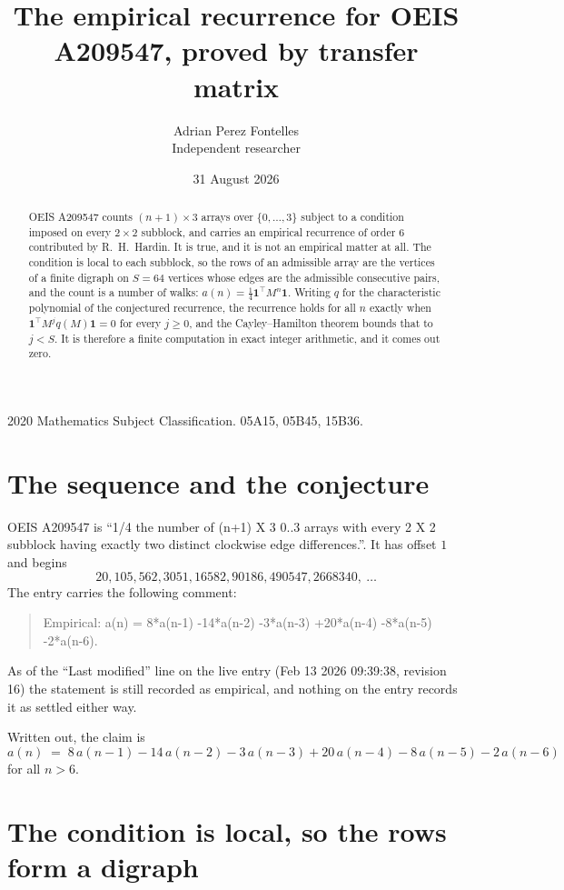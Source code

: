 \documentclass[11pt,a4paper]{article}
\title{The empirical recurrence for OEIS A209547, proved by transfer matrix}
\author{Adrian Perez Fontelles\\ \small Independent researcher}
\date{31 August 2026}
\theoremstyle{plain}
\theoremstyle{definition}
\begin{document}
\maketitle

\begin{abstract}
OEIS A209547 counts $(n+1)\times3$ arrays over $\{0,\dots,3\}$ subject to a condition imposed on
every $2\times2$ subblock, and carries an empirical recurrence of order $6$ contributed
by R.~H.~Hardin. It is true, and it is not an empirical matter at all. The condition is local
to each subblock, so the rows of an admissible array are the vertices of a finite digraph
on $S=64$ vertices whose edges are the admissible consecutive pairs, and the count is a
number of walks: $a(n)=\tfrac1{4}\mathbf{1}^{\!\top}M^{n}\mathbf{1}$. Writing $q$
for the characteristic polynomial of the conjectured recurrence, the recurrence holds for all
$n$ exactly when $\mathbf{1}^{\!\top}M^{j}q(M)\mathbf{1}=0$ for every $j\ge0$, and the
Cayley--Hamilton theorem bounds that to $j<S$. It is therefore a finite computation in exact
integer arithmetic, and it comes out zero.
\end{abstract}

\noindent\small 2020 Mathematics Subject Classification. 05A15, 05B45, 15B36.\normalsize

\section{The sequence and the conjecture}

OEIS A209547 is ``1/4 the number of (n+1) X 3 0..3 arrays with every 2 X 2 subblock having exactly two distinct clockwise edge differences.''. It has offset $1$ and begins
\[
20, 105, 562, 3051, 16582, 90186, 490547, 2668340,\ \dots
\]
The entry carries the following comment:
\begin{quote}\small
Empirical: a(n) = 8*a(n-1) -14*a(n-2) -3*a(n-3) +20*a(n-4) -8*a(n-5) -2*a(n-6).
\end{quote}
As of the ``Last modified'' line on the live entry (Feb 13 2026 09:39:38, revision 16) the statement is
still recorded as empirical, and nothing on the entry records it as settled either way.

Written out, the claim is
\begin{equation}\label{eq:conj}
a(n)\;=\;8\,a(n-1) - 14\,a(n-2) - 3\,a(n-3) + 20\,a(n-4) - 8\,a(n-5) - 2\,a(n-6)
\end{equation}
for all $n>6$.

\section{The condition is local, so the rows form a digraph}
\end{document}
